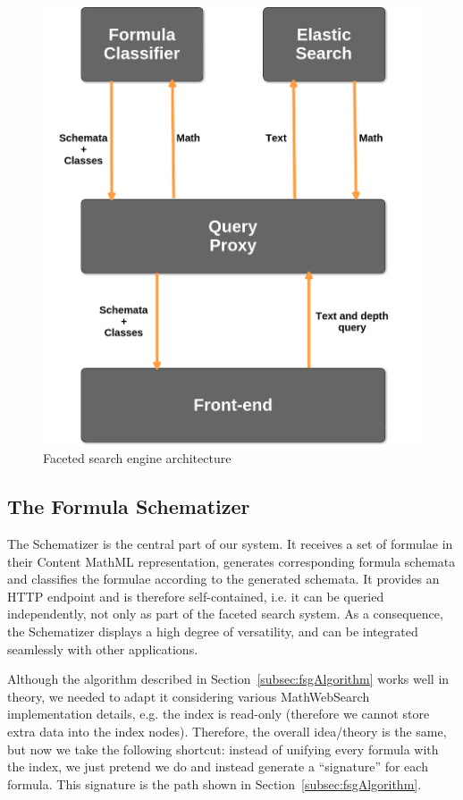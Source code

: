 \documentclass[a4paper,11pt,oneside]{article}
\def\mws{\textsf{MathWebSearch}\xspace}
\def\cmml{\textsf{Content MathML}\xspace}
\begin{document}
\begin{figure}[ht]\centering
    \includegraphics[width=12.8cm]{img/SchemaArchitecture.png}
    \caption{Faceted search engine architecture}\label{fig:sys_architecture}
\end{figure}

\subsection{The Formula Schematizer}\label{subsec:fschematizer}
The Schematizer is the central part of our system. It receives a set of
formulae in their \cmml representation, generates corresponding formula
schemata and classifies the formulae according to the generated schemata.
It provides an HTTP endpoint and is therefore self-contained, i.e. it can be
queried independently, not only as part of the faceted search system.
As a consequence, the Schematizer displays a high degree of versatility,
and can be integrated seamlessly with other applications.

Although the algorithm described in Section~\ref{subsec:fsgAlgorithm} works
well in theory, we needed to adapt it considering various \mws implementation
details, e.g. the index is read-only (therefore we cannot store extra data into
the index nodes). Therefore, the overall idea/theory is the same, but now we take the
following shortcut: instead of unifying every formula with the index, we just
pretend we do and instead generate a ``signature'' for each formula. This
signature is the path shown in Section~\ref{subsec:fsgAlgorithm}.
\end{document}
